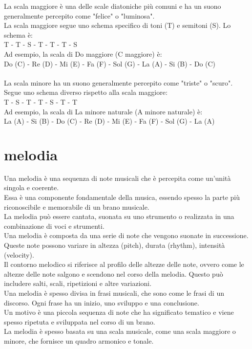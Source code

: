 \documentclass[a4paper,12pt]{report}
\begin{document}
La scala maggiore è una delle scale diatoniche più comuni e ha un suono generalmente percepito come "felice" o "luminosa". \\
La scala maggiore segue uno schema specifico di toni (T) e semitoni (S). Lo schema è: \\
T - T - S - T - T - T - S \\
Ad esempio, la scala di Do maggiore (C maggiore) è: \\
Do (C) - Re (D) - Mi (E) - Fa (F) - Sol (G) - La (A) - Si (B) - Do (C) \\
\\
La scala minore ha un suono generalmente percepito come "triste" o "scuro".  \\
Segue uno schema diverso rispetto alla scala maggiore: \\
T - S - T - T - S - T - T \\
Ad esempio, la scala di La minore naturale (A minore naturale) è: \\
La (A) - Si (B) - Do (C) - Re (D) - Mi (E) - Fa (F) - Sol (G) - La (A) \\

\section{melodia}

Una melodia è una sequenza di note musicali che è percepita come un'unità singola e coerente. \\
Essa è una componente fondamentale della musica, essendo spesso la parte più riconoscibile e memorabile di un brano musicale. \\
La melodia può essere cantata, suonata su uno strumento o realizzata in una combinazione di voci e strumenti. \\
Una melodia è composta da una serie di note che vengono suonate in successione. Queste note possono variare in altezza (pitch), durata (rhythm), intensità (velocity). \\
Il contorno melodico si riferisce al profilo delle altezze delle note, ovvero come le altezze delle note salgono e scendono nel corso della melodia. Questo può includere salti, scali, ripetizioni e altre variazioni. \\
Una melodia è spesso divisa in frasi musicali, che sono come le frasi di un discorso. Ogni frase ha un inizio, uno sviluppo e una conclusione. \\
Un motivo è una piccola sequenza di note che ha significato tematico e viene spesso ripetuta e sviluppata nel corso di un brano. \\
La melodia è spesso basata su una scala musicale, come una scala maggiore o minore, che fornisce un quadro armonico e tonale. 
\end{document}
